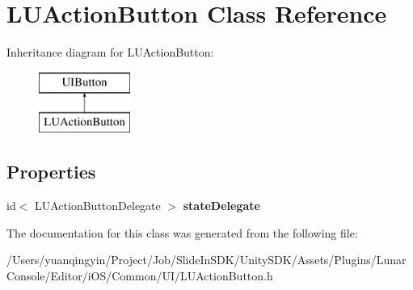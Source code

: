 \hypertarget{interface_l_u_action_button}{}\section{L\+U\+Action\+Button Class Reference}
\label{interface_l_u_action_button}
Inheritance diagram for L\+U\+Action\+Button\+:\begin{figure}[H]
\begin{center}
\leavevmode
\includegraphics[height=2.000000cm]{interface_l_u_action_button}
\end{center}
\end{figure}
\subsection*{Properties}
\begin{DoxyCompactItemize}
\item 
\mbox{\label{interface_l_u_action_button_a7c638c954d66bff86ebe169f3644be97}} 
id$<$ L\+U\+Action\+Button\+Delegate $>$ {\bfseries state\+Delegate}
\end{DoxyCompactItemize}


The documentation for this class was generated from the following file\+:\begin{DoxyCompactItemize}
\item 
/\+Users/yuanqingyin/\+Project/\+Job/\+Slide\+In\+S\+D\+K/\+Unity\+S\+D\+K/\+Assets/\+Plugins/\+Lunar\+Console/\+Editor/i\+O\+S/\+Common/\+U\+I/L\+U\+Action\+Button.\+h\end{DoxyCompactItemize}
